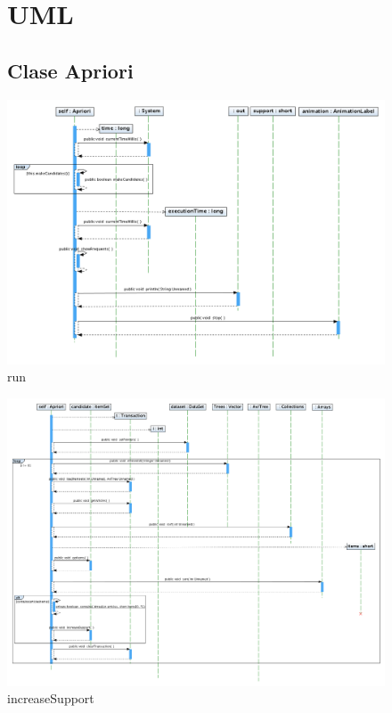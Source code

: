 \begin{figure}
\chapter{UML}
\section{Clase Apriori}
\includegraphics[width=1.2\textwidth]{Apriori/run.png}
\caption{run}
\end{figure}
\newpage
\begin{figure}
\includegraphics[width=1.2\textwidth]{Apriori/increaseSupport.png}
\caption{increaseSupport}
\end{figure}
